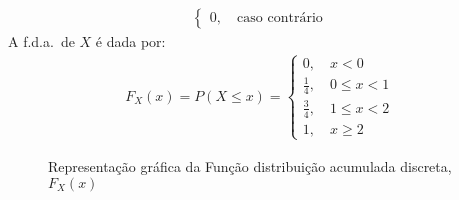 \begin{description}
\begin{example}
\begin{align*}
\begin{cases}
               0,\quad  \text{caso contrário}
             \end{cases}
           \end{align*}
           A f.d.a.\ de $X$ é dada por:
           \begin{align*}
             F_{X}(x)=P(X\le x)= 
             \begin{cases}
               0,\quad  x<0 \\
               \frac{1}{4}, \quad 0 \le x <1\\
               \frac{3}{4}, \quad 1 \le x < 2\\
               1, \quad x \geq 2
             \end{cases}
           \end{align*}

           \begin{figure}[H]
             \centering
             
             \caption{Representação gráfica da Função distribuição acumulada discreta, $F_{X}(x)$}
             \label{fig:}
           \end{figure}
       \end{example}     
   \end{description}
